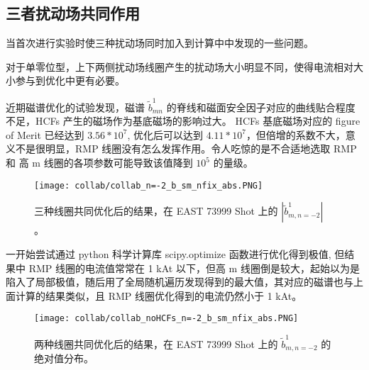 \subsection{三者扰动场共同作用}
  
  当首次进行实验时使三种扰动场同时加入到计算中中发现的一些问题。

  
     对于单零位型，上下两侧扰动场线圈产生的扰动场大小明显不同，使得电流相对大小参与到优化中更有必要。

     近期磁谱优化的试验发现，磁谱 $\tilde{b}^1_{mn}$ 的脊线和磁面安全因子对应的曲线贴合程度不足，HCFs 产生的磁场作为基底磁场的影响过大。
    HCFs 基底磁场对应的 figure of Merit 已经达到 $3.56 * 10^7$, 优化后可以达到 $4.11 * 10^7$，但倍增的系数不大，意义不是很明显，RMP 线圈没有怎么发挥作用。令人吃惊的是不合适地选取 RMP 和 高 m 线圈的各项参数可能导致该值降到 $10^5$ 的量级。 

    


  





  \begin{figure}[t]
    \centering
      \texttt{[image: collab/collab\_n=-2\_b\_sm\_nfix\_abs.PNG]}
    \caption{三种线圈共同优化后的结果，在 EAST 73999 Shot 上的 $|\tilde{b}^1_{m,n=-2}|$ 。}
  \end{figure}
  


  
  一开始尝试通过 python 科学计算库 scipy.optimize 函数进行优化得到极值, 但结果中 RMP 线圈的电流值常常在 1 kAt 以下，但高 m 线圈倒是较大，起始以为是陷入了局部极值，随后用了全局随机遍历发现得到的最大值，其对应的磁谱也与上面计算的结果类似，且 RMP 线圈优化得到的电流仍然小于 1 kAt。
  
  

  \begin{figure}[t]
    \centering
      \texttt{[image: collab/collab\_noHCFs\_n=-2\_b\_sm\_nfix\_abs.PNG]}
    \caption{两种线圈共同优化后的结果，在 EAST 73999 Shot 上的 $\tilde{b}^1_{m,n=-2}$ 的绝对值分布。}
  \end{figure}
  
